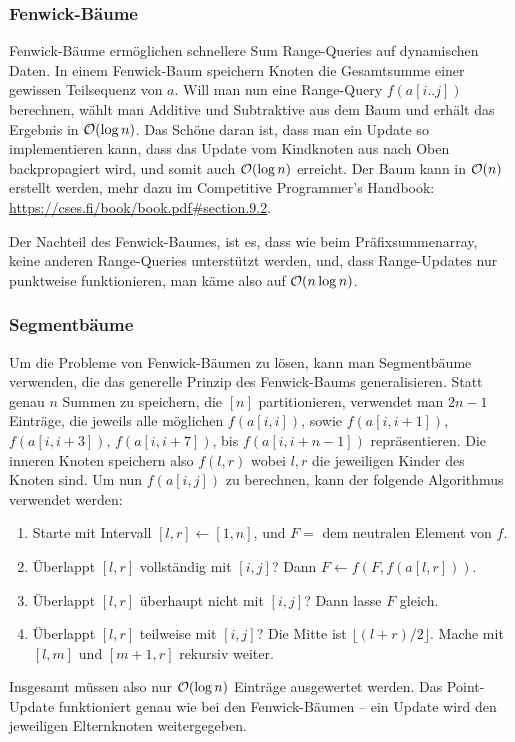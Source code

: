 \subsubsection{Fenwick-Bäume}
Fenwick-Bäume ermöglichen schnellere Sum Range-Queries auf dynamischen Daten.
In einem Fenwick-Baum speichern Knoten die Gesamtsumme einer gewissen Teilsequenz von \(a\).
Will man nun eine Range-Query \(f(a[i..j])\) berechnen, wählt man Additive und Subtraktive aus dem Baum und erhält das Ergebnis in \(\mathcal O(\log n)\).
Das Schöne daran ist, dass man ein Update so implementieren kann, dass das Update vom Kindknoten aus nach Oben backpropagiert wird, und somit auch \(\mathcal O(\log n)\) erreicht.
Der Baum kann in \(\mathcal O(n)\) erstellt werden, mehr dazu im Competitive Programmer's Handbook: \url{https://cses.fi/book/book.pdf#section.9.2}.

Der Nachteil des Fenwick-Baumes, ist es, dass wie beim Präfixsummenarray, keine anderen Range-Queries unterstützt werden, und, dass Range-Updates nur punktweise funktionieren, man käme also auf \(\mathcal O(n \log n)\).

\subsubsection{Segmentbäume}
Um die Probleme von Fenwick-Bäumen zu lösen, kann man Segmentbäume verwenden, die das generelle Prinzip des Fenwick-Baums generalisieren.
Statt genau \(n\) Summen zu speichern, die \([n]\) partitionieren, verwendet man \(2n-1\) Einträge, die jeweils alle möglichen \(f(a[i,i])\), sowie \(f(a[i,i+1])\), \(f(a[i,i+3])\), \(f(a[i,i+7])\), bis \(f(a[i,i+n-1])\) repräsentieren.
Die inneren Knoten speichern also \(f(l, r)\) wobei \(l, r\) die jeweiligen Kinder des Knoten sind.
Um nun \(f(a[i,j])\) zu berechnen, kann der folgende Algorithmus verwendet werden:
\begin{enumerate}
    \item Starte mit Intervall \([l, r] \leftarrow [1, n]\), und \(F = \) dem neutralen Element von \(f\).

    \item Überlappt \([l, r]\) vollständig mit \([i,j]\)?
        Dann \(F \leftarrow f(F, f(a[l, r]))\).

    \item Überlappt \([l, r]\) überhaupt nicht mit \([i,j]\)?
        Dann lasse \(F\) gleich.

    \item Überlappt \([l, r]\) teilweise mit \([i,j]\)?
        Die Mitte ist \(\lfloor(l+r)/2\rfloor\).
        Mache mit \([l, m]\) und \([m+1, r]\) rekursiv weiter.
\end{enumerate}
Insgesamt müssen also nur \(\mathcal O(\log n)\) Einträge ausgewertet werden.
Das Point-Update funktioniert genau wie bei den Fenwick-Bäumen -- ein Update wird den jeweiligen Elternknoten weitergegeben.

